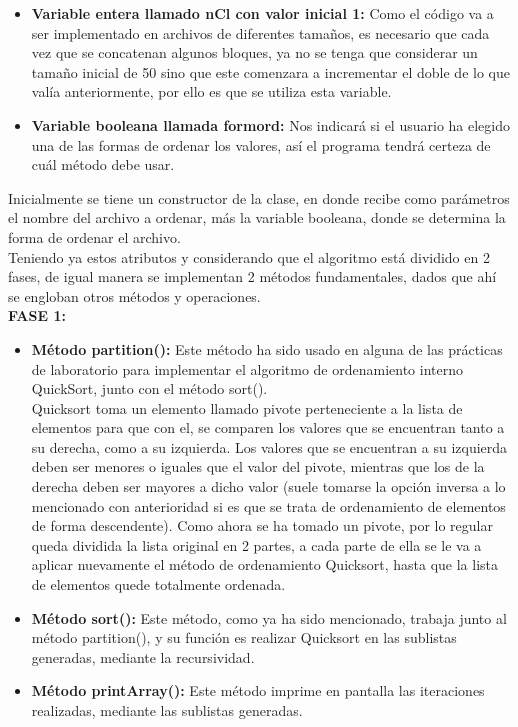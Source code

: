 \documentclass[12pt,letterpaper]{article}
\begin{document}
\begin{large}
\begin{itemize}[noitemsep,topsep=0pt]
\item\textbf{Variable entera llamado nCl con valor inicial 1:} Como el código va a ser implementado en archivos de diferentes tamaños, es necesario que cada vez que se concatenan algunos bloques, ya no se tenga que considerar un tamaño inicial de 50 sino que este comenzara a incrementar el doble de lo que valía anteriormente, por ello es que se utiliza esta variable.
\item\textbf{Variable booleana llamada formord:} Nos indicará si el usuario ha elegido una de las formas de ordenar los valores, así el programa tendrá certeza de cuál método debe usar.
\end{itemize}
Inicialmente se tiene un constructor de la clase, en donde recibe como parámetros el nombre del archivo a ordenar, más la variable booleana, donde se determina la forma de ordenar el archivo.\\
Teniendo ya estos atributos y considerando que el algoritmo está dividido en 2 fases, de igual manera se implementan 2 métodos fundamentales, dados que ahí se engloban otros métodos y operaciones.\\
\textbf{FASE 1:}
\begin{itemize}[noitemsep,topsep=0pt]
\item\textbf{Método partition():} Este método ha sido usado en alguna de las prácticas de laboratorio para implementar el algoritmo de ordenamiento interno QuickSort, junto con el método sort(). \\
Quicksort toma un elemento llamado pivote perteneciente a la lista de elementos para que con el, se comparen los valores que se encuentran tanto a su derecha, como a su izquierda. Los valores que se encuentran a su izquierda deben ser menores o iguales que el valor del pivote, mientras que los de la derecha deben ser mayores a dicho valor (suele tomarse la opción inversa a lo mencionado con anterioridad si es que se trata de ordenamiento de elementos de forma descendente). Como ahora se ha tomado un pivote, por lo regular queda dividida la lista original en 2 partes, a cada parte de ella se le va a aplicar nuevamente el método de ordenamiento Quicksort, hasta que la lista de elementos quede totalmente ordenada. 
\item\textbf{Método sort():} Este método, como ya ha sido mencionado, trabaja junto al método partition(), y su función es realizar Quicksort en las sublistas generadas, mediante la recursividad.
\item\textbf{Método printArray():} Este método imprime en pantalla las iteraciones realizadas, mediante las sublistas generadas. 

\end{itemize}
\end{large}
\end{document}
